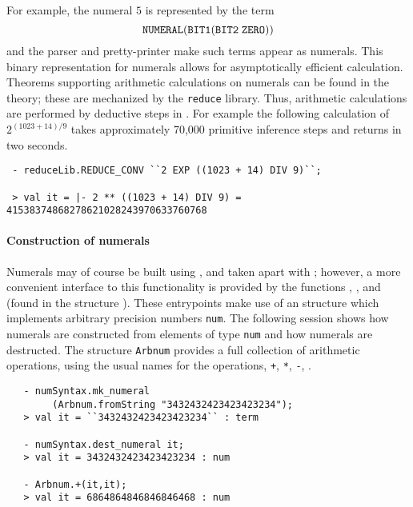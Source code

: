 \noindent For example, the numeral $5$ is represented by the term
\[
   \ml{NUMERAL}(\ml{BIT1}(\ml{BIT2}\;\ml{ZERO}))
\]
and the \HOL{} parser and pretty-printer make such terms appear as
numerals. This binary representation for numerals allows for
asymptotically efficient calculation. Theorems supporting arithmetic
calculations on numerals can be found in the 
theory; these are mechanized by the \verb+reduce+ library. Thus,
arithmetic calculations are performed by deductive steps in \HOL.
For example the following calculation of $2 ^{(1023 + 14)/9}$ takes
approximately 70,000 primitive inference steps and returns in two
seconds.
%
\begin{boxed}
{\small
\begin{verbatim}
 - reduceLib.REDUCE_CONV ``2 EXP ((1023 + 14) DIV 9)``;

 > val it = |- 2 ** ((1023 + 14) DIV 9) = 41538374868278621028243970633760768
\end{verbatim}}
\end{boxed}

\paragraph {Construction of numerals}

Numerals may of course be built using , and taken apart with
; however, a more convenient interface to this
functionality is provided by the functions ,
, and  (found in the structure
). These entrypoints make use of an \ML{} structure
 which implements arbitrary precision numbers {\verb+num+}. The
following session shows how \HOL{} numerals are constructed from elements of
type \verb+num+ and how numerals are destructed. The structure
{\small\verb+Arbnum+} provides a full collection of arithmetic
operations, using the usual names for the operations, \eg \verb|+|,
\verb|*|, \verb|-|, \etc.

\setcounter{sessioncount}{0}
\begin{session}
\begin{verbatim}
   - numSyntax.mk_numeral
        (Arbnum.fromString "3432432423423423234");
   > val it = ``3432432423423423234`` : term

   - numSyntax.dest_numeral it;
   > val it = 3432432423423423234 : num

   - Arbnum.+(it,it);
   > val it = 6864864846846846468 : num
\end{verbatim}
\end{session}

